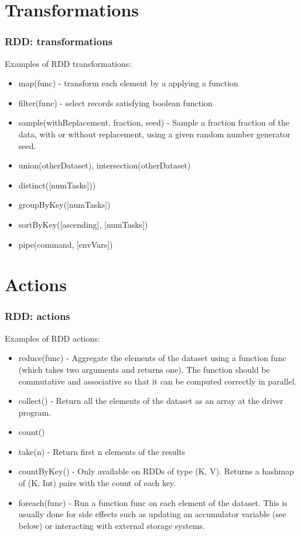 \documentclass{beamer}
\begin{document}
\section{Transformations}
\begin{frame}
  \frametitle{RDD: transformations}
  Examples of RDD transformations:
  \begin{itemize}
  \item {\color{mycolorcode}map(func)} - transform each element by a applying a function
  \item {\color{mycolorcode}filter(func)} - select records satisfying boolean function
  \item {\color{mycolorcode}sample(withReplacement, fraction, seed)} - Sample a fraction fraction of the data, with or without replacement, using a given random number generator seed.
  \item {\color{mycolorcode}union(otherDataset), intersection(otherDataset)}
  \item {\color{mycolorcode}distinct([numTasks]))}
  \item {\color{mycolorcode}groupByKey([numTasks])}
  \item {\color{mycolorcode}sortByKey([ascending], [numTasks])}
  \item {\color{mycolorcode}pipe(command, [envVars])}
  \end{itemize}
\end{frame}

\section{Actions}
\begin{frame}[fragile]
  \frametitle{RDD: actions}
  Examples of RDD actions:
  \begin{itemize}
  \item {\color{mycolorcode}reduce(func)} - Aggregate the elements of the dataset using a function func
    (which takes two arguments and returns one). 
    The function should be commutative and associative so that it can be computed correctly in parallel.
  \item {\color{mycolorcode}collect()} - Return all the elements of the dataset as an array at the driver program.
  \item {\color{mycolorcode}count()}
  \item {\color{mycolorcode}take(n)} - Return first n elements of the results
  \item {\color{mycolorcode}countByKey()} - Only available on RDDs of type (K, V). Returns a hashmap of (K, Int) pairs with the count of each key.
  \item {\color{mycolorcode}foreach(func)} - Run a function func on each element of the dataset. 
    This is usually done for side effects such as updating an accumulator variable (see below) or interacting with external storage systems.
  \end{itemize}
\end{frame}
\end{document}
